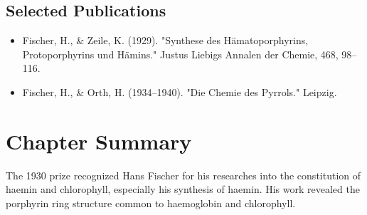 \subsection*{Selected Publications}

\begin{itemize}

\item Fischer, H., \& Zeile, K. (1929). "Synthese des Hämatoporphyrins, Protoporphyrins und Hämins." Justus Liebigs Annalen der Chemie, 468, 98--116.

\item Fischer, H., \& Orth, H. (1934--1940). "Die Chemie des Pyrrols." Leipzig.

\end{itemize}

\clearpage

\section*{Chapter Summary}

The 1930 prize recognized Hans Fischer for his researches into the constitution of haemin and chlorophyll, especially his synthesis of haemin. His work revealed the porphyrin ring structure common to haemoglobin and chlorophyll.
